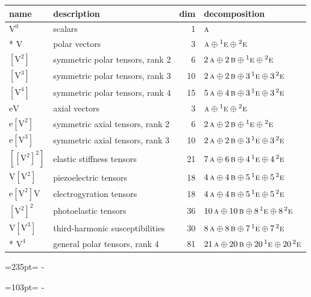 \documentclass[10pt,a4paper]{article}
\newcommand{\needspace}[1]{\par\penalty-100\begingroup\dimen0=#1\relax\dimen2=\pagegoal
  \advance\dimen2-\pagetotal\ifdim\dimen0>\dimen2\relax\ifdim\dimen2>0pt\vfil\break\fi\fi
  \endgroup}
\numberwithin{equation}{section}
\newcommand{\irr}[1]{\text{\normalfont\scshape #1}}
\newcommand{\conjpair}[1]{{}^{#1}}
\newcommand{\jahn}[1]{\mathrm{#1}}
\newlength{\fillwidth}\newlength{\cellwidth}\newlength{\colwidth}
\begin{document}
{\begin{longtable}{@{}llr>{\RaggedRight\arraybackslash}p{\fillwidth}@{}}
name & description & dim & decomposition\\\midrule\endhead
\bottomrule\endfoot\endlastfoot
$\jahn{V^{0}}$ & scalars & 1 & $\irr{a}$\\*
$\jahn{V}$ & polar vectors & 3 & $\irr{a} \oplus\allowbreak \conjpair{1}\irr{e} \oplus\allowbreak \conjpair{2}\irr{e}$\\
$\jahn{[V^{2}]}$ & symmetric polar tensors, rank 2 & 6 & $2\,\irr{a} \oplus\allowbreak 2\,\irr{b} \oplus\allowbreak \conjpair{1}\irr{e} \oplus\allowbreak \conjpair{2}\irr{e}$\\
$\jahn{[V^{3}]}$ & symmetric polar tensors, rank 3 & 10 & $2\,\irr{a} \oplus\allowbreak 2\,\irr{b} \oplus\allowbreak 3\,\conjpair{1}\irr{e} \oplus\allowbreak 3\,\conjpair{2}\irr{e}$\\
$\jahn{[V^{4}]}$ & symmetric polar tensors, rank 4 & 15 & $5\,\irr{a} \oplus\allowbreak 4\,\irr{b} \oplus\allowbreak 3\,\conjpair{1}\irr{e} \oplus\allowbreak 3\,\conjpair{2}\irr{e}$\\
$\jahn{eV}$ & axial vectors & 3 & $\irr{a} \oplus\allowbreak \conjpair{1}\irr{e} \oplus\allowbreak \conjpair{2}\irr{e}$\\
$\jahn{e[V^{2}]}$ & symmetric axial tensors, rank 2 & 6 & $2\,\irr{a} \oplus\allowbreak 2\,\irr{b} \oplus\allowbreak \conjpair{1}\irr{e} \oplus\allowbreak \conjpair{2}\irr{e}$\\
$\jahn{e[V^{3}]}$ & symmetric axial tensors, rank 3 & 10 & $2\,\irr{a} \oplus\allowbreak 2\,\irr{b} \oplus\allowbreak 3\,\conjpair{1}\irr{e} \oplus\allowbreak 3\,\conjpair{2}\irr{e}$\\
$\jahn{[[V^{2}]^{2}]}$ & elastic stiffness tensors & 21 & $7\,\irr{a} \oplus\allowbreak 6\,\irr{b} \oplus\allowbreak 4\,\conjpair{1}\irr{e} \oplus\allowbreak 4\,\conjpair{2}\irr{e}$\\
$\jahn{V[V^{2}]}$ & piezoelectric tensors & 18 & $4\,\irr{a} \oplus\allowbreak 4\,\irr{b} \oplus\allowbreak 5\,\conjpair{1}\irr{e} \oplus\allowbreak 5\,\conjpair{2}\irr{e}$\\
$\jahn{e[V^{2}]V}$ & electrogyration tensors & 18 & $4\,\irr{a} \oplus\allowbreak 4\,\irr{b} \oplus\allowbreak 5\,\conjpair{1}\irr{e} \oplus\allowbreak 5\,\conjpair{2}\irr{e}$\\
$\jahn{[V^{2}]^{2}}$ & photoelastic tensors & 36 & $10\,\irr{a} \oplus\allowbreak 10\,\irr{b} \oplus\allowbreak 8\,\conjpair{1}\irr{e} \oplus\allowbreak 8\,\conjpair{2}\irr{e}$\\
$\jahn{V[V^{3}]}$ & third-harmonic susceptibilities & 30 & $8\,\irr{a} \oplus\allowbreak 8\,\irr{b} \oplus\allowbreak 7\,\conjpair{1}\irr{e} \oplus\allowbreak 7\,\conjpair{2}\irr{e}$\\*
$\jahn{V^{4}}$ & general polar tensors, rank 4 & 81 & $21\,\irr{a} \oplus\allowbreak 20\,\irr{b} \oplus\allowbreak 20\,\conjpair{1}\irr{e} \oplus\allowbreak 20\,\conjpair{2}\irr{e}$\\
\bottomrule\end{longtable}}
\needspace{235pt}
\needspace{103pt}
\end{document}
